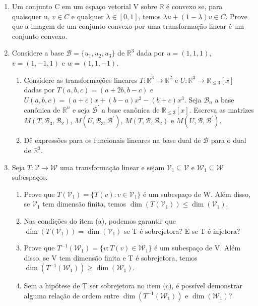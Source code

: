 \documentclass[12pt]{article}
\begin{document}
\begin{enumerate}
    \item Um conjunto C em um espaço vetorial V sobre $\mathbb{R}$ é convexo se, para quaisquer u, $v\in C$ e qualquer $\lambda\in[0,1]$, temos $\lambda u+(1-\lambda)v\in C$. Prove que a imagem de um conjunto convexo por uma transformação linear é um conjunto convexo.
    
    \item Considere a base $\mathcal{B}=\{u_{1},u_{2},u_{3}\}$ de $\mathbb{R}^{3}$ dada por $u=(1,1,1)$, $v=(1,-1,1)$ e $w=(1,1,-1)$.
    \begin{enumerate}
        \item[(a)] Considere as transformações lineares $T:\mathbb{R}^{3}\rightarrow\mathbb{R}^{2}$ e $U:\mathbb{R}^{3}\rightarrow\mathbb{R}_{\le3}[x]$ dadas por $T(a,b,c) = (a+2b,b-c)$ e $U(a,b,c) = (a+c)x + (b-a)x^2 - (b+c)x^3$. Seja $\mathcal{B}_{n}$ a base canônica de $\mathbb{R}^{n}$ e seja $\mathcal{B}^{\prime}$ a base canônica de $\mathbb{R}_{\le3}[x]$. 
        Escreva as matrizes $M(T,\mathcal{B}_{3},\mathcal{B}_{2})$, $M(U,\mathcal{B}_{3},\mathcal{B}^{\prime})$, $M(T,\mathcal{B},\mathcal{B}_{2})$ e $M(U,\mathcal{B},\mathcal{B}^{\prime})$.
        \item[(b)] Dê expressões para os funcionais lineares na base dual de $\mathcal{B}$ para o dual de $\mathbb{R}^{3}$.
    \end{enumerate}
    
    \item Seja $T:\mathcal{V}\rightarrow\mathcal{W}$ uma transformação linear e sejam $\mathcal{V}_{1}\subseteq\mathcal{V}$ e $\mathcal{W}_{1}\subseteq\mathcal{W}$ subespaços.
    \begin{enumerate}
        \item[(a)] Prove que $T(\mathcal{V}_{1})=\{T(v):v\in\mathcal{V}_{1}\}$ é um subespaço de W. Além disso, se $\mathcal{V}_{1}$ tem dimensão finita, temos $\dim(T(\mathcal{V}_{1}))\le \dim(\mathcal{V}_{1})$.
        \item[(b)] Nas condições do item (a), podemos garantir que $\dim(T(\mathcal{V}_{1}))=\dim(\mathcal{V}_{1})$ se T é sobrejetora? E se T é injetora?
        \item[(c)] Prove que $T^{-1}(\mathcal{W}_{1})=\{v:T(v)\in\mathcal{W}_{1}\}$ é um subespaço de V. Além disso, se V tem dimensão finita e T é sobrejetora, temos $\dim(T^{-1}(\mathcal{W}_{1}))\ge \dim(\mathcal{W}_{1})$.
        \item[(d)] Sem a hipótese de T ser sobrejetora no item (c), é possível demonstrar alguma relação de ordem entre $\dim(T^{-1}(\mathcal{W}_{1}))$ e $\dim(\mathcal{W}_{1})$?
    \end{enumerate}
    

\end{enumerate}
\end{document}
